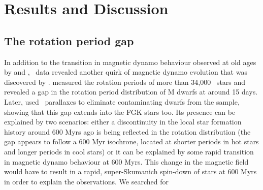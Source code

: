 \section{Results and Discussion}
\label{sec:results_and_discussion}

\subsection{The rotation period gap}
In addition to the transition in magnetic dynamo behaviour observed at old
ages by \citet{angus2015} and \citet{vansaders2016}, \kepler\ data revealed
another quirk of magnetic dynamo evolution that was discovered by
\citet{mcquillan2014}.
\citet{mcquillan2014} measured the rotation periods of more than 34,000
\kepler\ stars and revealed a gap in the rotation period distribution of M
dwarfs at around 15 days.
Later, \citet{davenport2017} used \Gaia\ parallaxes to eliminate contaminating
dwarfs from the \citet{mcquillan2014} sample, showing that this gap extends
into the FGK stars too.
Its presence can be explained by two scenarios: either a discontinuity in the
local star formation history around 600 Myrs ago is being reflected in the
rotation distribution (the gap appears to follow a 600 Myr isochrone, located
at shorter periods in hot stars and longer periods in cool stars) or it can be
explained by some rapid transition in magnetic dynamo behaviour at 600 Myrs.
This change in the magnetic field would have to result in a rapid,
super-Skumanich spin-down of stars at 600 Myrs in order to explain the
observations.
We searched for
